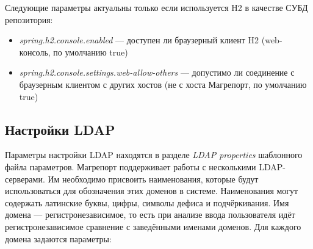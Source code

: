 \documentclass[../user-manual.tex]{subfiles}
\begin{document}
	Следующие параметры актуальны только если используется H2 в качестве СУБД репозитория:
	
	\begin{itemize}
		\item \textit{spring.h2.console.enabled} --- доступен ли браузерный клиент H2 (web-консоль, по умолчанию true)
		\item \textit{spring.h2.console.settings.web-allow-others} --- допустимо ли соединение с браузерным клиентом с других хостов (не с хоста Магрепорт, по умолчанию true)
	\end{itemize}
	
	\subsection{Настройки LDAP}
	
	Параметры настройки LDAP находятся в разделе \textit{LDAP properties} шаблонного файла параметров. Магрепорт поддерживает работы с несколькими LDAP-серверами. Им необходимо присвоить наименования, которые будут использоваться для обозначения этих доменов в системе. Наименования могут содержать латинские буквы, цифры, символы дефиса и подчёркивания. Имя домена --- регистронезависимое, то есть при анализе ввода пользователя идёт регистронезависимое сравнение с заведёнными именами доменов. Для каждого домена задаются параметры:
	
\end{document}
